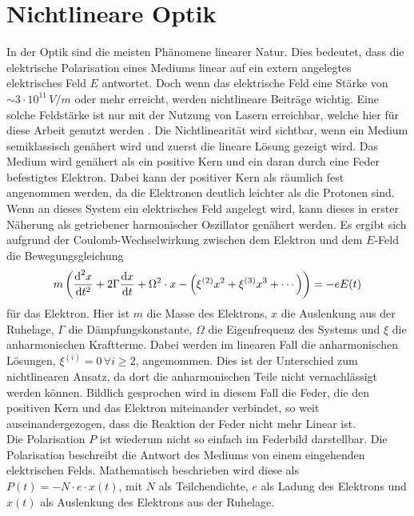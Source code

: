 \section{Nichtlineare Optik}
\label{sec:NLO}
In der Optik sind die meisten Phänomene linearer Natur. 
Dies bedeutet, dass die elektrische Polarisation eines Mediums 
linear auf ein extern angelegtes elektrisches Feld $E$ antwortet.
Doch wenn das elektrische Feld eine 
Stärke von $\sim3\cdot10^{11}\,\unit{V/m}$ oder mehr erreicht, werden nichtlineare Beiträge wichtig. 
Eine solche Feldstärke ist nur mit der Nutzung von Lasern erreichbar, welche 
hier für diese Arbeit genutzt werden \cite{Butcher_Cotter_1990}. 
Die Nichtlinearität wird sichtbar, wenn ein Medium semiklassisch genähert wird und zuerst 
die lineare Lösung gezeigt wird. 
Das Medium wird genähert als ein positive Kern und ein daran durch eine Feder befestigtes Elektron. 
Dabei kann der positiver Kern als räumlich fest angenommen werden, da die 
Elektronen deutlich leichter als die Protonen sind.
Wenn an dieses System ein elektrisches Feld angelegt wird, kann 
dieses in erster Näherung als getriebener harmonischer Oszillator genähert werden. 
Es ergibt sich aufgrund der Coulomb-Wechselwirkung zwischen dem Elektron und dem $E$-Feld die Bewegungsgleichung 
\begin{equation}
    \label{eqn:bew}
    m\left(\frac{\text d^2x}{\text d t^2}+2\Gamma \frac{\text d x}{\text d t}+\Omega^2\cdot x-\left(\xi^{(2)}x^2+\xi^{(3)}x^3+\dotsb\right)\right)= -e E(t)
\end{equation}
für das Elektron.
Hier ist $m$ die Masse des Elektrons, $x$ die Auslenkung aus der Ruhelage, $\Gamma$ 
die Dämpfungskonstante, 
$\Omega$ die Eigenfrequenz des Systems und $\xi$ die anharmonischen Kraftterme.
Dabei werden im linearen Fall die anharmonischen Lösungen, $\xi^{(i)}=0\, \forall i \ge 2$, angemommen. 
Dies ist der Unterschied zum nichtlinearen Ansatz, da dort die anharmonischen Teile 
nicht vernachlässigt werden können. 
Bildlich gesprochen wird in diesem Fall die Feder, die den positiven Kern und das Elektron 
miteinander verbindet, so weit auseinandergezogen, dass die Reaktion der Feder nicht mehr 
Linear ist.\\ 
Die Polarisation $P$ ist wiederum nicht so einfach im Federbild darstellbar. 
Die Polarisation beschreibt die Antwort des Mediums von einem 
eingehenden elektrischen Felds. 
Mathematisch beschrieben wird diese als $P(t)= -N\cdot e\cdot x(t)$, mit $N$ als Teilchendichte, 
$e$ als Ladung des Elektrons und $x(t)$ als Auslenkung des Elektrons aus der Ruhelage. 
